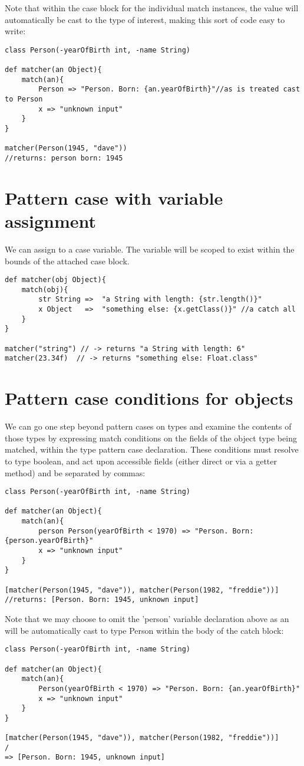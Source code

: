 \documentclass[conc-doc]{subfiles}
\begin{document}
Note that within the case block for the individual match instances, the value will automatically be cast to the type of interest, making this sort of code easy to write:
\begin{lstlisting}
class Person(-yearOfBirth int, -name String)

def matcher(an Object){
	match(an){
		Person => "Person. Born: {an.yearOfBirth}"//as is treated cast to Person
		x => "unknown input"
	}
}

matcher(Person(1945, "dave"))
//returns: person born: 1945
\end{lstlisting}


\section{Pattern case with variable assignment}
We can assign to a case variable. The variable will be scoped to exist within the bounds of the attached case block.

\begin{lstlisting}
def matcher(obj Object){
	match(obj){
		str String =>  "a String with length: {str.length()}" 
		x Object   =>  "something else: {x.getClass()}" //a catch all
	}
}

matcher("string") // -> returns "a String with length: 6"
matcher(23.34f)  // -> returns "something else: Float.class"
\end{lstlisting}


\section{Pattern case conditions for objects}
We can go one step beyond pattern cases on types and examine the contents of those types by expressing match conditions on the fields of the object type being matched, within the type pattern case declaration. These conditions must resolve to type boolean, and act upon accessible fields (either direct or via a getter method) and be separated by commas:
\begin{lstlisting}
class Person(-yearOfBirth int, -name String)

def matcher(an Object){
	match(an){
		person Person(yearOfBirth < 1970) => "Person. Born: {person.yearOfBirth}"
		x => "unknown input"
	}
}

[matcher(Person(1945, "dave")), matcher(Person(1982, "freddie"))]
//returns: [Person. Born: 1945, unknown input]
\end{lstlisting}

Note that we may choose to omit the 'person' variable declaration above as an will be automatically cast to type Person within the body of the catch block:
\begin{lstlisting}
class Person(-yearOfBirth int, -name String)

def matcher(an Object){
	match(an){
		Person(yearOfBirth < 1970) => "Person. Born: {an.yearOfBirth}"
		x => "unknown input"
	}
}

[matcher(Person(1945, "dave")), matcher(Person(1982, "freddie"))]
/
=> [Person. Born: 1945, unknown input]
\end{lstlisting}
\end{document}
